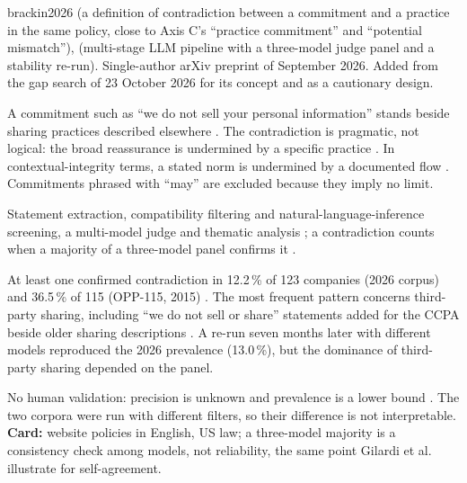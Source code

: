 \begin{papercard}{brackin2026}
  (a definition of contradiction between a commitment and a practice in the same policy, close to Axis C's ``practice commitment'' and ``potential mismatch''),  (multi-stage LLM pipeline with a three-model judge panel and a stability re-run). Single-author arXiv preprint of September 2026. Added from the gap search of 23 October 2026 for its concept and as a cautionary design.

 A commitment such as ``we do not sell your personal information'' stands beside sharing practices described elsewhere . The contradiction is pragmatic, not logical: the broad reassurance is undermined by a specific practice . In contextual-integrity terms, a stated norm is undermined by a documented flow . Commitments phrased with ``may'' are excluded because they imply no limit.

 Statement extraction, compatibility filtering and natural-language-inference screening, a multi-model judge and thematic analysis ; a contradiction counts when a majority of a three-model panel confirms it .

 At least one confirmed contradiction in 12.2\,\% of 123 companies (2026 corpus) and 36.5\,\% of 115 (OPP-115, 2015) . The most frequent pattern concerns third-party sharing, including ``we do not sell or share'' statements added for the CCPA beside older sharing descriptions . A re-run seven months later with different models reproduced the 2026 prevalence (13.0\,\%), but the dominance of third-party sharing depended on the panel.

 No human validation: precision is unknown and prevalence is a lower bound . The two corpora were run with different filters, so their difference is not interpretable. \textbf{Card:} website policies in English, US law; a three-model majority is a consistency check among models, not reliability, the same point Gilardi et al.\  illustrate for self-agreement.


\end{papercard}

